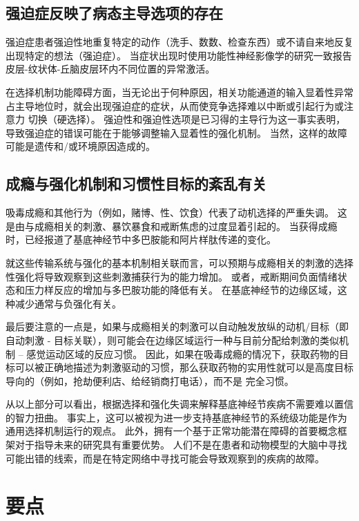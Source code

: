 \subsection{强迫症反映了病态主导选项的存在}

强迫症患者强迫性地重复特定的动作（洗手、数数、检查东西）或不请自来地反复出现特定的想法（强迫症）。
当症状出现时使用功能性神经影像学的研究一致报告皮层-纹状体-丘脑皮层环内不同位置的异常激活。


在选择机制功能障碍方面，当无论出于何种原因，相关功能通道的输入显着性异常占主导地位时，就会出现强迫症的症状，从而使竞争选择难以中断或引起行为或注意力 切换（硬选择）。
强迫性和强迫性选项是已习得的主导行为这一事实表明，导致强迫症的错误可能在于能够调整输入显着性的强化机制。
当然，这样的故障可能是遗传和/或环境原因造成的。



\subsection{成瘾与强化机制和习惯性目标的紊乱有关}

吸毒成瘾和其他行为（例如，赌博、性、饮食）代表了动机选择的严重失调。
这是由与成瘾相关的刺激、暴饮暴食和戒断焦虑的过度显着引起的。
当获得成瘾时，已经报道了基底神经节中多巴胺能和阿片样肽传递的变化。


就这些传输系统与强化的基本机制相关联而言，可以预期与成瘾相关的刺激的选择性强化将导致观察到这些刺激捕获行为的能力增加。
或者，戒断期间负面情绪状态和压力样反应的增加与多巴胺功能的降低有关。
在基底神经节的边缘区域，这种减少通常与负强化有关。


最后要注意的一点是，如果与成瘾相关的刺激可以自动触发放纵的动机/目标（即自动刺激 - 目标关联），则可能会在边缘区域运行一种与目前分配给刺激的类似机制 – 感觉运动区域的反应习惯。
因此，如果在吸毒成瘾的情况下，获取药物的目标可以被正确地描述为刺激驱动的习惯，那么获取药物的实用性就可以是高度目标导向的（例如，抢劫便利店、给经销商打电话），而不是 完全习惯。


从以上部分可以看出，根据选择和强化失调来解释基底神经节疾病不需要难以置信的智力扭曲。
事实上，这可以被视为进一步支持基底神经节的系统级功能是作为通用选择机制运行的观点。
此外，拥有一个基于正常功能潜在障碍的首要概念框架对于指导未来的研究具有重要优势。
人们不是在患者和动物模型的大脑中寻找可能出错的线索，而是在特定网络中寻找可能会导致观察到的疾病的故障。



\section{要点}

